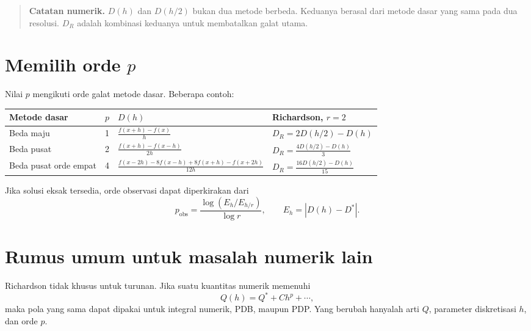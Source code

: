 \documentclass[book,english,noindex,lean,nobackpage,nocopyright,noupdate,nofiglist,notablist]{enacom}
\newcommand{\Note}[1]{\begin{quote}\textbf{Catatan numerik.} #1\end{quote}}
\begin{document}
\Note{$D(h)$ dan $D(h/2)$ bukan dua metode berbeda. Keduanya berasal dari metode dasar yang sama pada dua resolusi. $D_R$ adalah kombinasi keduanya untuk membatalkan galat utama.}

\section{Memilih orde $p$}
Nilai $p$ mengikuti orde galat metode dasar. Beberapa contoh:
\begin{center}
\renewcommand{\arraystretch}{1.18}
\begin{tabularx}{0.96\textwidth}{p{}c X X}
\hline
\textbf{Metode dasar} & \textbf{$p$} & \textbf{$D(h)$} & \textbf{Richardson, $r=2$}\\\hline
Beda maju & 1 &
$\displaystyle \frac{f(x+h)-f(x)}{h}$ &
$\displaystyle D_R=2D(h/2)-D(h)$\\[2mm]
Beda pusat & 2 &
$\displaystyle \frac{f(x+h)-f(x-h)}{2h}$ &
$\displaystyle D_R=\frac{4D(h/2)-D(h)}{3}$\\[2mm]
Beda pusat orde empat & 4 &
$\displaystyle \frac{f(x-2h)-8f(x-h)+8f(x+h)-f(x+2h)}{12h}$ &
$\displaystyle D_R=\frac{16D(h/2)-D(h)}{15}$\\[2mm]\hline
\end{tabularx}
\end{center}

Jika solusi eksak tersedia, orde observasi dapat diperkirakan dari
\begin{equation}
p_{\mathrm{obs}}=
\frac{\log(E_h/E_{h/r})}{\log r},
\qquad E_h=|D(h)-D^*|.
\label{eq:pobs}
\end{equation}

\section{Rumus umum untuk masalah numerik lain}
Richardson tidak khusus untuk turunan. Jika suatu kuantitas numerik memenuhi
\begin{equation}
Q(h)=Q^*+Ch^p+\cdots,
\label{eq:rich-other}
\end{equation}
maka pola yang sama dapat dipakai untuk integral numerik, PDB, maupun PDP. Yang berubah hanyalah arti $Q$, parameter diskretisasi $h$, dan orde $p$.
\end{document}
